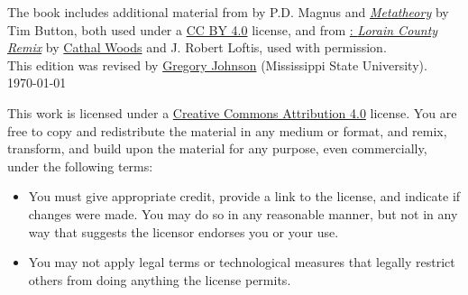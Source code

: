 \noindent The book includes additional material from \forallx{} by P.D. Magnus 
and \href{http://people.ds.cam.ac.uk/tecb2/metatheory.shtml}{\emph{Metatheory}} by Tim Button, 
both used under a \href{https://creativecommons.org/licenses/by/4.0/}{CC BY 4.0} license, 
and from \href{https://github.com/rob-helpy-chalk/openintroduction}{\forallx: \emph{Lorain County Remix}} by \href{https://sites.google.com/site/cathalwoods/}{Cathal Woods} and J. Robert Loftis, used with permission.\\[1ex]

\noindent This edition was revised by \href{http://loighic.net/}{Gregory Johnson} (Mississippi State University).\\[1ex]
\indent \today

\bigskip
\bigskip

\noindent \footnotesize This work is licensed under a \href{https://creativecommons.org/licenses/by/4.0/}{Creative Commons Attribution 4.0} license. 
You are free to copy and redistribute the material in any medium or format, and  remix, transform, and build upon the material for any purpose, even commercially, under the following terms:
\begin{itemize}
\item You must give appropriate credit, provide a link to the license, and indicate if changes were made. You may do so in any reasonable manner, but not in any way that suggests the licensor endorses you or your use.
\item You may not apply legal terms or technological measures that legally restrict others from doing anything the license permits.
\end{itemize}



\normalsize 
